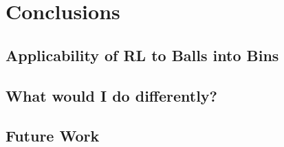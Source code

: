 
\chapter{Conclusions}\label{conclusion}

\ifpdf
    \graphicspath{{Chapter3/Figs/Raster/}{Chapter3/Figs/PDF/}{Chapter3/Figs/}}
\else
    \graphicspath{{Chapter3/Figs/Vector/}{Chapter3/Figs/}}
\fi




\section{Applicability of RL to Balls into Bins}


\section{What would I do differently?}


\section{Future Work}
